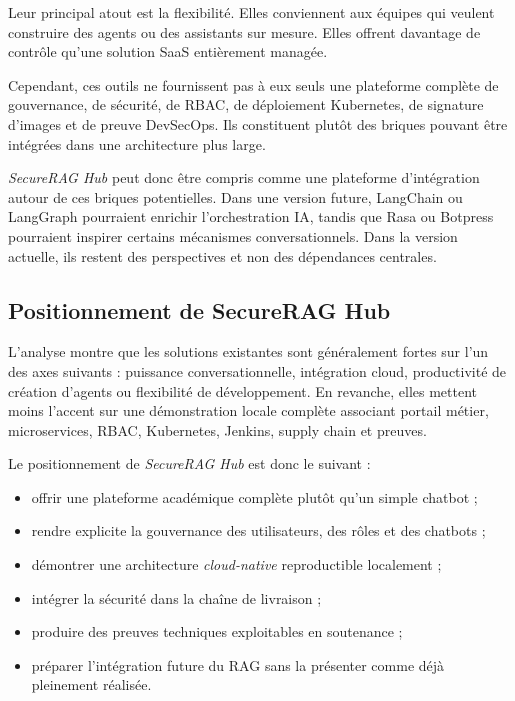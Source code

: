 Leur principal atout est la flexibilité. Elles conviennent aux équipes qui veulent construire des agents ou des assistants sur mesure. Elles offrent davantage de contrôle qu'une solution SaaS entièrement managée.

Cependant, ces outils ne fournissent pas à eux seuls une plateforme complète de gouvernance, de sécurité, de RBAC, de déploiement Kubernetes, de signature d'images et de preuve DevSecOps. Ils constituent plutôt des briques pouvant être intégrées dans une architecture plus large.

\textit{SecureRAG Hub} peut donc être compris comme une plateforme d'intégration autour de ces briques potentielles. Dans une version future, LangChain ou LangGraph pourraient enrichir l'orchestration IA, tandis que Rasa ou Botpress pourraient inspirer certains mécanismes conversationnels. Dans la version actuelle, ils restent des perspectives et non des dépendances centrales.

\subsection{Positionnement de SecureRAG Hub}

L'analyse montre que les solutions existantes sont généralement fortes sur l'un des axes suivants : puissance conversationnelle, intégration cloud, productivité de création d'agents ou flexibilité de développement. En revanche, elles mettent moins l'accent sur une démonstration locale complète associant portail métier, microservices, RBAC, Kubernetes, Jenkins, supply chain et preuves.

Le positionnement de \textit{SecureRAG Hub} est donc le suivant :

\begin{itemize}
    \item offrir une plateforme académique complète plutôt qu'un simple chatbot ;
    \item rendre explicite la gouvernance des utilisateurs, des rôles et des chatbots ;
    \item démontrer une architecture \textit{cloud-native} reproductible localement ;
    \item intégrer la sécurité dans la chaîne de livraison ;
    \item produire des preuves techniques exploitables en soutenance ;
    \item préparer l'intégration future du RAG sans la présenter comme déjà pleinement réalisée.
\end{itemize}

